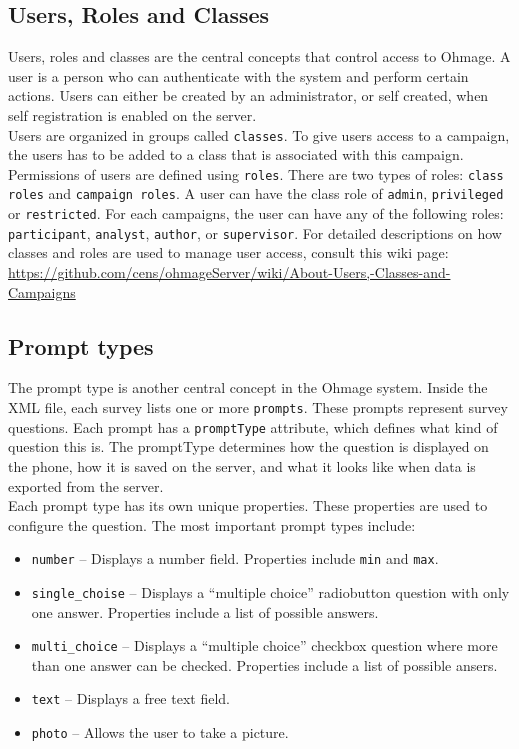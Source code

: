 \documentclass{scrartcl}
\begin{document}
\subsection{Users, Roles and Classes}
Users, roles and classes are the central concepts that control access to Ohmage.
A user is a person who can authenticate with the system and perform certain
actions. Users can either be created by an administrator, or self created,
when self registration is enabled on the server.\\

Users are organized in groups called \texttt{classes}. To give users access to a
campaign, the users has to be added to a class that is associated with this
campaign.\\

Permissions of users are defined using \texttt{roles}. There are two types of
roles: \texttt{class roles} and \texttt{campaign roles}. A user can have the
class role of \texttt{admin}, \texttt{privileged} or \texttt{restricted}. 
For each campaigns, the user can have any of the following roles:
\texttt{participant}, \texttt{analyst}, \texttt{author}, or \texttt{supervisor}.
For detailed descriptions on how classes and roles are used to manage user
access, consult this wiki page:\\

\url{https://github.com/cens/ohmageServer/wiki/About-Users,-Classes-and-Campaigns}



\subsection{Prompt types}

The prompt type is another central concept in the Ohmage system. Inside the XML
file, each survey lists one or more \texttt{prompts}. These prompts represent
survey questions. Each prompt has a \texttt{promptType} attribute, which defines
what kind of question this is. The promptType determines how the question is
displayed on the phone, how it is saved on the server, and what it looks like
when data is exported from the server. \\

Each prompt type has its own unique properties. These properties are used to
configure the question. The most important prompt types include:

\begin{itemize}
  \item \texttt{number} -- Displays a number field. Properties include
  \texttt{min} and \texttt{max}.
  \item \texttt{single\_choise} -- Displays a ``multiple choice'' radiobutton
  question with only one answer. Properties include a list of possible answers.
  \item \texttt{multi\_choice} -- Displays a ``multiple choice'' checkbox
  question where more than one answer can be checked. Properties include a list of
  possible ansers.
  \item \texttt{text} -- Displays a free text field.
  \item \texttt{photo} -- Allows the user to take a picture.
\end{itemize}
\end{document}
